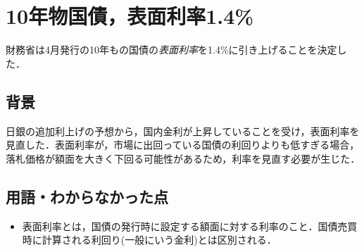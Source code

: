 \documentclass{ltjsarticle}
\begin{document}
\section{10年物国債，表面利率1.4\%}

財務省は4月発行の10年もの国債の\emph{表面利率}を1.4\%に引き上げることを決定した．

\subsection{背景}

日銀の追加利上げの予想から，国内金利が上昇していることを受け，表面利率を見直した．表面利率が，市場に出回っている国債の利回りよりも低すぎる場合，落札価格が額面を大きく下回る可能性があるため，利率を見直す必要が生じた．


\subsection{用語・わからなかった点}

\begin{itemize}
  \item 表面利率とは，国債の発行時に設定する額面に対する利率のこと．国債売買時に計算される利回り(一般にいう金利)とは区別される．
\end{itemize}
\end{document}
